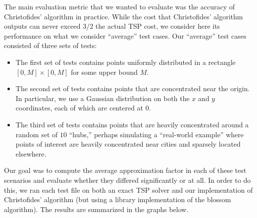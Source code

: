 \documentclass{article}
\begin{document}
The main evaluation metric that we wanted to evaluate was the accuracy of Christofides' algorithm in practice. While the cost that Christofides' algorithm outputs can never exceed $3/2$ the actual TSP cost, we consider here its performance on what we consider ``average'' test cases. Our ``average'' test cases consisted of three sets of tests: 
\begin{itemize}
	\item The first set of tests contains points uniformly distributed in a rectangle $[0, M] \times [0, M]$ for some upper bound $M$.
	\item The second set of tests contains points that are concentrated near the origin. In particular, we use a Gaussian distribution on both the $x$ and $y$ coordinates, each of which are centered at $0$.
	\item The third set of tests contains points that are heavily concentrated around a random set of $10$ ``hubs,'' perhaps simulating a ``real-world example'' where points of interest are heavily concentrated near cities and sparsely located elsewhere. 
\end{itemize}

Our goal was to compute the average approximation factor in each of these test scenarios and evaluate whether they differed significantly or at all. In order to do this, we ran each test file on both an exact TSP solver and our implementation of Christofides' algorithm (but using a library implementation of the blossom algorithm). The results are summarized in the graphs below.
\end{document}
